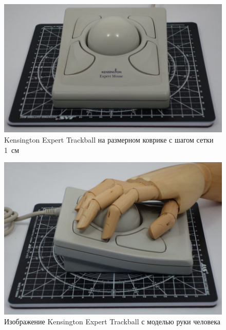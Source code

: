\documentclass[11pt, a4paper]{article}
\begin{document}


\begin{figure}[h]
    \centering
    \includegraphics[scale=0.3]{1996_kensington_expert_trackball_5/kingset.jpg}
    \caption{Kensington Expert Trackball на размерном коврике с шагом сетки 1~см}
    \label{fig:size}
\end{figure}


\begin{figure}[h]
    \centering
    \includegraphics[scale=0.3]{1996_kensington_expert_trackball_5/kingset2.jpg}
    \caption{Изображение Kensington Expert Trackball с моделью руки человека}
    \label{fig:hand}
\end{figure}
\end{document}
